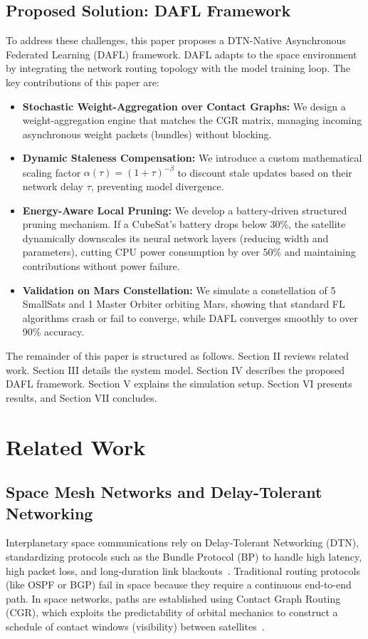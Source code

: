 \documentclass[journal,twocolumn]{IEEEtran}
\newcommand{\dafl}{\textsf{DAFL}}
\newcommand{\cgr}{\textsf{CGR}}
\newcommand{\dtn}{\textsf{DTN}}
\begin{document}
\subsection{Proposed Solution: DAFL Framework}
To address these challenges, this paper proposes a DTN-Native Asynchronous Federated Learning (\dafl{}) framework. \dafl{} adapts to the space environment by integrating the network routing topology with the model training loop. The key contributions of this paper are:
\begin{itemize}
    \item \textbf{Stochastic Weight-Aggregation over Contact Graphs:} We design a weight-aggregation engine that matches the \cgr{} matrix, managing incoming asynchronous weight packets (bundles) without blocking.
    \item \textbf{Dynamic Staleness Compensation:} We introduce a custom mathematical scaling factor $\alpha(\tau) = (1 + \tau)^{-\beta}$ to discount stale updates based on their network delay $\tau$, preventing model divergence.
    \item \textbf{Energy-Aware Local Pruning:} We develop a battery-driven structured pruning mechanism. If a CubeSat's battery drops below 30\%, the satellite dynamically downscales its neural network layers (reducing width and parameters), cutting CPU power consumption by over 50\% and maintaining contributions without power failure.
    \item \textbf{Validation on Mars Constellation:} We simulate a constellation of 5 SmallSats and 1 Master Orbiter orbiting Mars, showing that standard FL algorithms crash or fail to converge, while \dafl{} converges smoothly to over 90\% accuracy.
\end{itemize}

The remainder of this paper is structured as follows. Section II reviews related work. Section III details the system model. Section IV describes the proposed \dafl{} framework. Section V explains the simulation setup. Section VI presents results, and Section VII concludes.

\section{Related Work}
\label{sec:related}

\subsection{Space Mesh Networks and Delay-Tolerant Networking}
Interplanetary space communications rely on Delay-Tolerant Networking (\dtn{}), standardizing protocols such as the Bundle Protocol (BP) to handle high latency, high packet loss, and long-duration link blackouts~\cite{dtn2016space}. Traditional routing protocols (like OSPF or BGP) fail in space because they require a continuous end-to-end path. In space networks, paths are established using Contact Graph Routing (\cgr{}), which exploits the predictability of orbital mechanics to construct a schedule of contact windows (visibility) between satellites~\cite{cgr2015predictive}.
\end{document}
